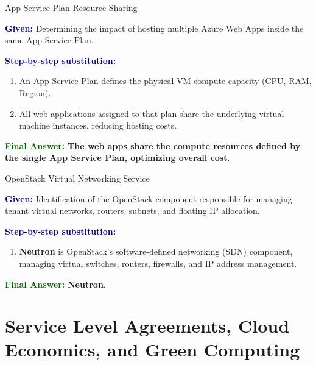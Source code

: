 \documentclass[11pt,a4paper,openany]{report}
\newcommand{\Given}{\par\textbf{\textcolor{navy}{Given:}} }
\newcommand{\Steps}{\par\textbf{\textcolor{navy}{Step-by-step substitution:}}\par}
\newcommand{\Answer}{\par\textbf{\textcolor{darkgreen}{Final Answer:}} }
\begin{document}
\begin{solved}{App Service Plan Resource Sharing}
\Given Determining the impact of hosting multiple Azure Web Apps inside the same App Service Plan.
\Steps
\begin{enumerate}[leftmargin=*]
  \item An App Service Plan defines the physical VM compute capacity (CPU, RAM, Region).
  \item All web applications assigned to that plan share the underlying virtual machine instances, reducing hosting costs.
\end{enumerate}
\Answer \textbf{The web apps share the compute resources defined by the single App Service Plan, optimizing overall cost}.
\end{solved}

\begin{solved}{OpenStack Virtual Networking Service}
\Given Identification of the OpenStack component responsible for managing tenant virtual networks, routers, subnets, and floating IP allocation.
\Steps
\begin{enumerate}[leftmargin=*]
  \item \textbf{Neutron} is OpenStack's software-defined networking (SDN) component, managing virtual switches, routers, firewalls, and IP address management.
\end{enumerate}
\Answer \textbf{Neutron}.
\end{solved}

\chapter{Service Level Agreements, Cloud Economics, and Green Computing}
\end{document}
